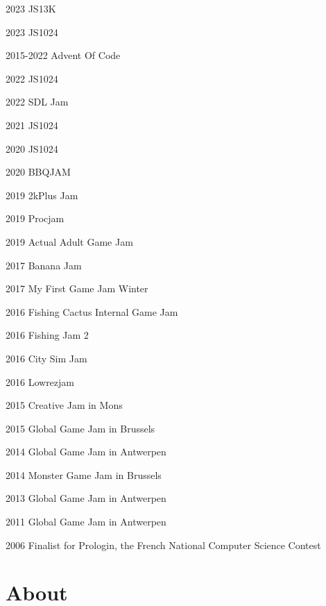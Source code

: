 \documentclass[11pt,letterpaper]{report}
\begin{document}
    \begin{tablist}

        \item[2023]        \tab{}JS13K
        \item[2023]        \tab{}JS1024
        \item[2015-2022]   \tab{}Advent Of Code
        \item[2022]        \tab{}JS1024
        \item[2022]        \tab{}SDL Jam
        \item[2021]        \tab{}JS1024
        \item[2020]        \tab{}JS1024
        \item[2020]        \tab{}BBQJAM
        \item[2019]        \tab{}2kPlus Jam
        \item[2019]        \tab{}Procjam
        \item[2019]        \tab{}Actual Adult Game Jam
        \item[2017]        \tab{}Banana Jam
        \item[2017]        \tab{}My First Game Jam Winter
        \item[2016]        \tab{}Fishing Cactus Internal Game Jam
        \item[2016]        \tab{}Fishing Jam 2
        \item[2016]        \tab{}City Sim Jam
        \item[2016]        \tab{}Lowrezjam
        \item[2015]        \tab{}Creative Jam in Mons
        \item[2015]        \tab{}Global Game Jam in Brussels
        \item[2014]        \tab{}Global Game Jam in Antwerpen
        \item[2014]        \tab{}Monster Game Jam in Brussels
        \item[2013]        \tab{}Global Game Jam in Antwerpen
        \item[2011]        \tab{}Global Game Jam in Antwerpen
        \item[2006]        \tab{}Finalist for Prologin, the French National Computer Science Contest

    \end{tablist}

    \section*{About}
\end{document}
